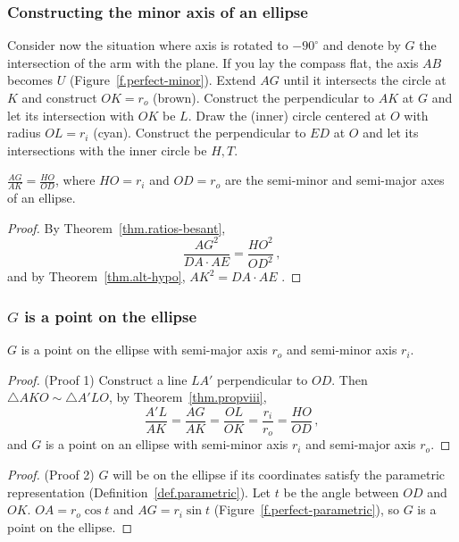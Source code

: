 \subsubsection*{Constructing the minor axis of an ellipse}

Consider now the situation where axis is rotated to $-90^\circ$ and denote by $G$ the intersection of the arm with the plane. If you lay the compass flat, the axis $AB$ becomes $U$ (Figure~\ref{f.perfect-minor}). Extend $AG$ until it intersects the circle at $K$ and construct $OK=r_o$ (brown). Construct the perpendicular to $AK$ at $G$ and let its intersection with $OK$ be $L$. Draw the (inner) circle centered at $O$ with radius $OL=r_i$ (cyan). Construct the perpendicular to $ED$ at $O$ and let its intersections with the inner circle be $H,T$.

\begin{theorem}\label{thm.propviii}
$\frac{AG}{AK}=\frac{HO}{OD}$, where $HO=r_i$ and $OD=r_o$ are the semi-minor and semi-major axes of an ellipse.
\end{theorem}
\begin{proof}
By Theorem~\ref{thm.ratios-besant},
\[
\frac{AG^2}{DA\cdot AE} = \frac{HO^2}{OD^2}\,,
\]
and by Theorem~\ref{thm.alt-hypo}, $AK^2=DA\cdot AE$ .\hqed
\end{proof}

\subsubsection*{$G$ is a point on the ellipse}

\begin{theorem}
$G$ is a point on the ellipse with semi-major axis $r_o$ and semi-minor axis $r_i$.
\end{theorem}
\begin{proof} (Proof 1)
Construct a line $LA'$ perpendicular to $OD$. Then $\triangle AKO \sim \triangle A'LO$, by Theorem~\ref{thm.propviii},
\[
\frac{A'L}{AK}=\frac{AG}{AK}=\frac{OL}{OK}=\frac{r_i}{r_o}=\frac{HO}{OD}\,,
\]
and $G$ is a point on an ellipse with semi-minor axis $r_i$ and semi-major axis $r_o$.\hqed
\end{proof}


\begin{proof} (Proof 2)
$G$ will be on the ellipse if its coordinates satisfy the parametric representation (Definition~\ref{def.parametric}). Let $t$ be the angle between $OD$ and $OK$. $OA=r_o\cos t$ and $AG=r_i\sin t$ (Figure~\ref{f.perfect-parametric}), so $G$ is a point on the ellipse. \hqed
\end{proof}


